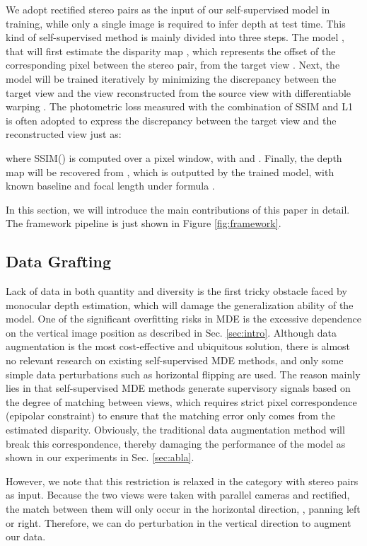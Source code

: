 \documentclass[10pt,twocolumn,letterpaper]{article}
\begin{document}
We adopt rectified stereo pairs as the input of our self-supervised model 
in training, while only a single image is required to infer depth at 
test time. This kind of self-supervised method is mainly divided into three 
steps. The model , 
that will first estimate the disparity map , which represents the offset of 
the corresponding pixel between the stereo pair, from the target view 
. Next, the model will be trained iteratively 
by minimizing the discrepancy between the target view and the view  
reconstructed from the source view  with differentiable warping . 
The photometric loss measured with the combination of SSIM \cite{Wang2004} and 
L1 is often adopted to express the discrepancy between the target view and 
the reconstructed view just as:

where SSIM() is computed over a  pixel window, with  
and . Finally, the depth map  
will be recovered from , which is outputted by the trained model, with known 
baseline  and focal length  under formula . 

In this section, we will introduce the main contributions of this paper in detail. 
The framework pipeline is just shown in Figure \ref{fig:framework}. 

\subsection{Data Grafting} \label{sec:dg}

Lack of data in both quantity and diversity is the first tricky obstacle faced by 
monocular depth estimation, which will damage the generalization ability of the model. 
One of the significant overfitting risks in MDE is the excessive dependence on the vertical 
image position as described in Sec. \ref{sec:intro}. Although data augmentation is the most 
cost-effective and ubiquitous solution, there is almost no relevant research on 
existing self-supervised MDE methods, and only some simple data perturbations such 
as horizontal flipping are used. The reason mainly lies in that self-supervised MDE 
methods generate supervisory signals based on the degree of matching between views, 
which requires strict pixel correspondence (epipolar constraint) to ensure that the 
matching error only comes from the estimated disparity. 
Obviously, the traditional data augmentation method will break this correspondence, 
thereby damaging the performance of the model as shown in our experiments 
in Sec. \ref{sec:abla}. 

However, we note that this restriction is relaxed in the category with stereo pairs 
as input. Because the two views were taken with parallel cameras and rectified, the 
match between them will only occur in the horizontal direction, \eg, panning left 
or right. Therefore, we can do perturbation in the vertical direction to augment 
our data. 
\end{document}
